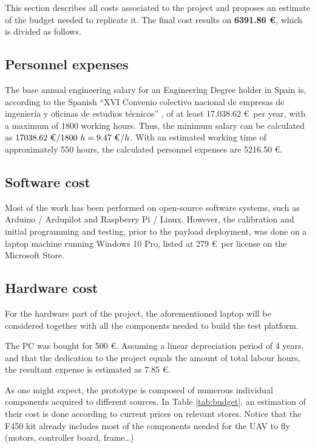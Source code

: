 This section describes all costs associated to the project and proposes an estimate
of the budget needed to replicate it. The final cost results on \textbf{6391.86 \euro}, which is divided as follows.

\subsection{Personnel expenses}
The base annual engineering salary for an Engineering Degree holder in Spain is, according to the Spanish ``XVI Convenio colectivo nacional de empresas de ingenier\'ia y oficinas de estudios t\'ecnicos'' \cite{disposicin16097deboenm274de20112011}, of at least 17,038.62 \euro\ per year, with a maximum of 1800 working hours.
Thus, the minimum salary can be calculated as $17038.62\ \text{\euro} / 1800\ h = 9.47\ \text{\euro}/h $. With an estimated working time of approximately 550 hours, the calculated personnel expenses are 5216.50 \euro.

\subsection{Software cost}
Most of the work has been performed on open-source software systems, such as Arduino / Ardupilot and Raspberry Pi / Linux.
However, the calibration and initial programming and testing, prior to the payload deployment, was done on a laptop machine running Windows 10 Pro, listed at 279 \euro\ per license on the Microsoft Store.

\subsection{Hardware cost}
For the hardware part of the project, the aforementioned laptop will be considered together with all the components needed to build the test platform.

The PC was bought for 500 \euro. Assuming a linear depreciation period of 4 years, and that the dedication to the project equals the amount of total labour hours, the resultant expense is estimated as 7.85 \euro.

As one might expect, the prototype is composed of numerous individual components acquired to different sources.
In Table \ref{tab:budget}, an estimation of their cost is done according to current prices on relevant stores.
Notice that the F450 kit already includes most of the components needed for the UAV to fly (motors, controller board, frame\ldots)



